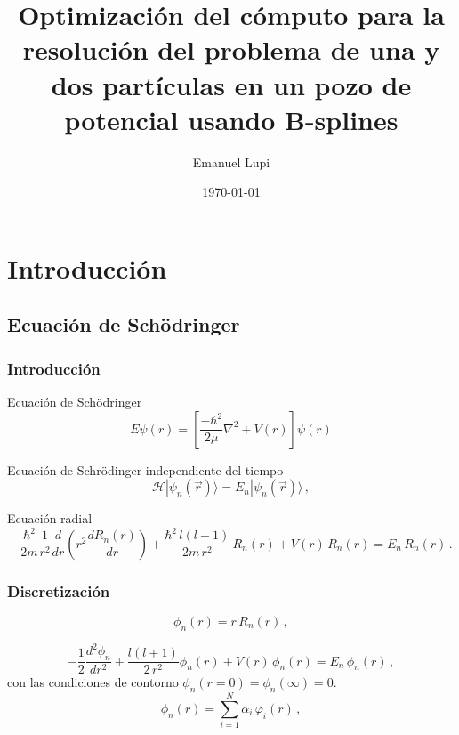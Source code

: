\documentclass{beamer}
\title[]{Optimizaci\'on del c\'omputo para la resoluci\'on del problema de una y dos part\'iculas en un pozo de potencial usando B-splines}
\author[]{Emanuel Lupi}
\institute[]
{
  Universidad Nacional de C\'ordoba\\
  FaMAF
}
\date{\today}
\begin{document}
\frame{\titlepage}

\section{Introducci\'on}
\subsection{Ecuaci\'on de Sch\"odringer}

\begin{frame}
  \frametitle{Introducci\'on}
  \begin{block}{Ecuaci\'on de Sch\"odringer}
    \begin{displaymath}
        E\psi(r) = \left[\frac{-\hbar^2}{2\mu} \nabla^2 + V(r)\right]\psi(r)
    \end{displaymath}
  \end{block}

  \begin{block}{Ecuaci\'on de Schr\"odinger independiente del tiempo}
      \begin{displaymath}\label{ec_schrodinger}
        \mathcal{H} |\psi_n(\vec{r})\rangle = E_n |\psi_n(\vec{r})\rangle\,,
      \end{displaymath}
  \end{block}

  \begin{block}{Ecuaci\'on radial}
    \begin{displaymath}
        -\frac{\hbar^2}{2m} \frac{1}{r^2}\frac{d}{dr}\left(r^2\frac{dR_n(r)}{dr}\right) 
        + \frac{\hbar^2\,l(l+1)}{2m\,r^2}\,R_n(r) + V(r)\,R_n(r) = E_n\,R_n(r)\,.
    \end{displaymath}
  \end{block}
\end{frame}


\begin{frame}
  \frametitle{Discretizaci\'on}
    
  \begin{displaymath}
    \phi_n(r) = r\,R_n(r)\,,
  \end{displaymath} 

  \begin{displaymath}
    -\frac{1}{2} \frac{d^2 \phi_n}{dr^2} + \frac{l(l+1)}{2\,r^2} \phi_n(r) + V(r)\,\phi_n(r) = E_n\,\phi_n(r)\,,
  \end{displaymath} 
  con las condiciones de contorno $\phi_n(r=0)=\phi_n(\infty) = 0$.
  \begin{displaymath}\label{combinacion_lineal}
      \phi_n(r) = \sum_{i=1}^{N} \alpha_i\,\varphi_i(r)\,,
  \end{displaymath}
\end{frame}
\end{document}

